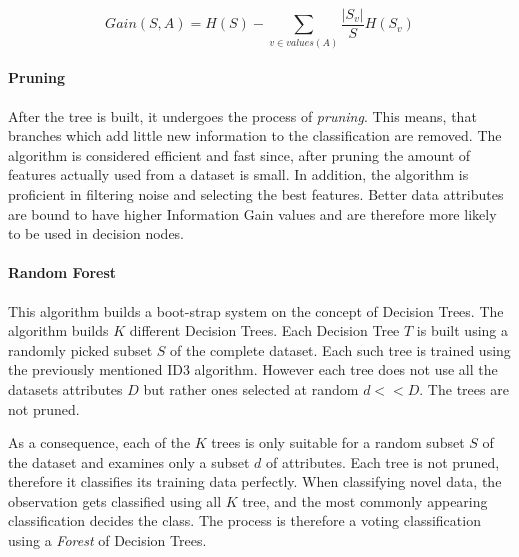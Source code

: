 			\begin{equation}
			Gain(S,A) = H(S) - \sum_{v \in values(A) } \frac{|S_v|}{S} H(S_v)
			\label{dt_info_gain}
	 \end{equation}
	 
	 \paragraph{Pruning}
		 After the tree is built, it undergoes the process of \textit{pruning}. This means, that branches which add little new information to the classification are removed. The algorithm is considered efficient and fast since, after pruning the amount of features actually used from a dataset is small. In addition, the algorithm is proficient in filtering noise and selecting the best features. Better data attributes are bound to have higher Information Gain values and are therefore more likely to be used in decision nodes.
	
	\paragraph{Random Forest}
		This algorithm builds a boot-strap system on the concept of Decision Trees. The algorithm \cite{breiman1984classification} builds $ K $ different Decision Trees. Each Decision Tree $ T $ is built using a randomly picked subset $ S $ of the complete dataset. Each such tree is trained using the previously mentioned ID3 algorithm. However each tree does not use all the datasets attributes $ D $ but rather ones selected at random $ d << D $. The trees are not pruned. 
		
		\par
		As a consequence, each of the $ K $ trees is only suitable for a random subset $ S $ of the dataset and examines only a subset $ d $ of attributes. Each tree is not pruned, therefore it classifies its training data perfectly. When classifying novel data, the observation gets classified using all $ K $ tree, and the most commonly appearing classification decides the class. The process is therefore a voting classification using a \textit{Forest} of Decision Trees.
 
	
	
